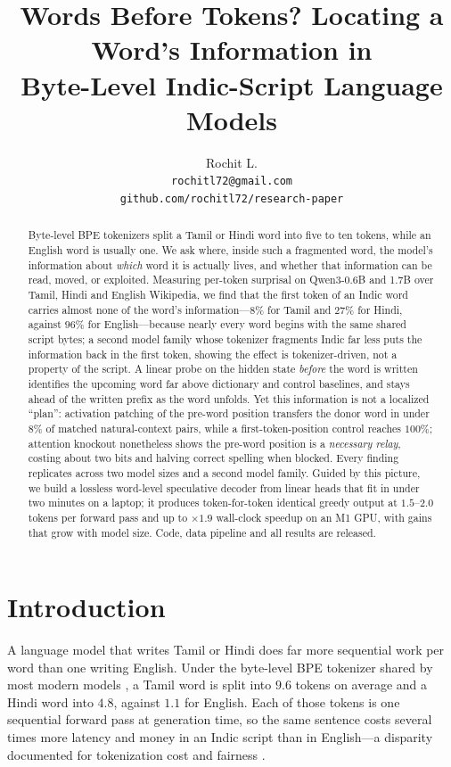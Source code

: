\documentclass[11pt]{article}
\title{Words Before Tokens? Locating a Word's Information in\\
Byte-Level Indic-Script Language Models}
\author{Rochit L. \\
  \texttt{rochitl72@gmail.com} \\
  \texttt{github.com/rochitl72/research-paper}}
\newcommand{\x}{$\times$}
\begin{document}
\maketitle

\begin{abstract}
Byte-level BPE tokenizers split a Tamil or Hindi word into five to ten
tokens, while an English word is usually one. We ask where, inside such a
fragmented word, the model's information about \emph{which} word it is
actually lives, and whether that information can be read, moved, or exploited.
Measuring per-token surprisal on Qwen3-0.6B and 1.7B over Tamil, Hindi and
English Wikipedia, we find that the first token of an Indic word carries
almost none of the word's information---$8\%$ for Tamil and $27\%$ for Hindi,
against $96\%$ for English---because nearly every word begins with the same
shared script bytes; a second model family whose tokenizer fragments Indic far
less puts the information back in the first token, showing the effect is
tokenizer-driven, not a property of the script. A linear probe on the hidden
state \emph{before} the word
is written identifies the upcoming word far above dictionary and control
baselines, and stays ahead of the written prefix as the word unfolds. Yet this
information is not a localized ``plan'': activation patching of the pre-word
position transfers the donor word in under $8\%$ of matched natural-context
pairs, while a first-token-position control reaches $100\%$; attention
knockout nonetheless shows the pre-word position is a \emph{necessary relay},
costing about two bits and halving correct spelling when blocked. Every finding
replicates across two model sizes and a second model family. Guided by this
picture, we build a lossless word-level speculative decoder from linear heads
that fit in under two minutes on a laptop; it produces token-for-token
identical greedy output at $1.5$--$2.0$ tokens per forward pass and up to
\x$1.9$ wall-clock speedup on an M1 GPU, with gains that grow with model size.
Code, data pipeline and all results are released.
\end{abstract}

\section{Introduction}

A language model that writes Tamil or Hindi does far more sequential work per
word than one writing English. Under the byte-level BPE tokenizer shared by
most modern models \citep{radford2019gpt2,sennrich2016bpe}, a Tamil word is
split into $9.6$ tokens on average and a Hindi word into $4.8$, against $1.1$
for English. Each of those tokens is one sequential forward pass at
generation time, so the same sentence costs several times more latency and
money in an Indic script than in English---a disparity documented for
tokenization cost and fairness \citep{petrov2023tokenizers,ahia2023costs}.
\end{document}
